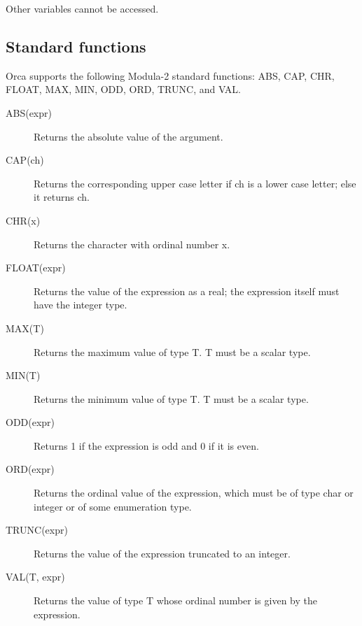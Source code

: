 \documentclass[10pt]{article}
\begin{document}
Other variables cannot be accessed.
\subsection{Standard functions}\label{sec:standard_funcs}

Orca supports the following Modula-2 standard functions:
ABS, CAP, CHR, FLOAT, MAX, MIN, ODD, ORD, TRUNC, and VAL.
\begin{description}
\item[ABS(expr)]
Returns the absolute value of the argument.
\item[CAP(ch)]
Returns the corresponding upper case letter if ch
is a lower case letter; else it returns ch.
\item[CHR(x)]
Returns the character with ordinal number x.
\item[FLOAT(expr)]
Returns the value of the expression as a real; the expression itself
must have the integer type.
\item[MAX(T)]
Returns the maximum value of type T.
T must be a scalar type.
\item[MIN(T)]
Returns the minimum value of type T.
T must be a scalar type.
\item[ODD(expr)]
Returns 1 if the expression is odd and 0 if it is even.
\item[ORD(expr)]
Returns the ordinal value of the expression, which must be of
type char or integer or of some enumeration type.
\item[TRUNC(expr)]
Returns the value of the expression truncated to an integer.
\item[VAL(T, expr)]
Returns the value of type T whose ordinal number is given by the expression.
\end{description}
\end{document}
